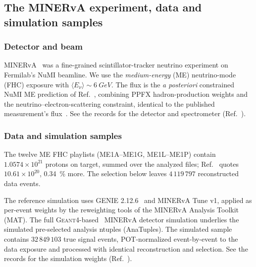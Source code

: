 \subsection{The MINERvA experiment, data and simulation samples}
\label{sec:experiment}

\subsubsection{Detector and beam}
MINERvA~\cite{MINERvA:2013zvz} was a fine-grained scintillator-tracker neutrino experiment on Fermilab's NuMI beamline. We use the \emph{medium-energy} (ME) neutrino-mode (FHC) exposure with $\langle E_\nu\rangle\sim\SI{6}{GeV}$. The flux is the \emph{a posteriori} constrained NuMI ME prediction of Ref.~\cite{MINERvA:2016iqn}, combining PPFX hadron-production weights and the neutrino--electron-scattering constraint, identical to the published measurement's flux~\cite{MINERvA:2021owq}. See the records for the detector and spectrometer (Ref.~\cite{NoteRecords2026}).

\subsubsection{Data and simulation samples}
The twelve ME FHC playlists (ME1A--ME1G, ME1L--ME1P) contain $1.0574\times10^{21}$ protons on target, summed over the analyzed files; Ref.~\cite{MINERvA:2021owq} quotes $10.61\times10^{20}$, \SI{0.34}{\percent} more. The selection below leaves $4\,119\,797$ reconstructed data events. %

The reference simulation uses GENIE 2.12.6~\cite{Andreopoulos:2009rq} and MINERvA Tune v1, applied as per-event weights by the reweighting tools of the MINERvA Analysis Toolkit (MAT). The full \textsc{Geant4}-based~\cite{GEANT4:2002zbu} MINERvA detector simulation underlies the simulated pre-selected analysis ntuples (AnaTuples). The simulated sample contains $32\,849\,103$ true signal events, POT-normalized event-by-event to the data exposure and processed with identical reconstruction and selection. See the records for the simulation weights (Ref.~\cite{NoteRecords2026}).

